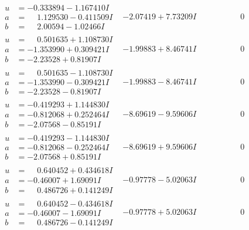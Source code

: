 \documentclass[1p]{elsarticle_modified}
\theoremstyle{definition}
\begin{document}
$$\begin{array}{c|c|c}
\begin{aligned}
u &= -0.333894 - 1.167410 I \\
a &= \phantom{-}1.129530 - 0.411509 I \\
b &= \phantom{-}2.00594 - 1.02466 I\end{aligned}
 & -2.07419 + 7.73209 I & \phantom{-0.000000 } 0 \\ \hline\begin{aligned}
u &= \phantom{-}0.501635 + 1.108730 I \\
a &= -1.353990 + 0.309421 I \\
b &= -2.23528 + 0.81907 I\end{aligned}
 & -1.99883 + 8.46741 I & \phantom{-0.000000 } 0 \\ \hline\begin{aligned}
u &= \phantom{-}0.501635 - 1.108730 I \\
a &= -1.353990 - 0.309421 I \\
b &= -2.23528 - 0.81907 I\end{aligned}
 & -1.99883 - 8.46741 I & \phantom{-0.000000 } 0 \\ \hline\begin{aligned}
u &= -0.419293 + 1.144830 I \\
a &= -0.812068 + 0.252464 I \\
b &= -2.07568 - 0.85191 I\end{aligned}
 & -8.69619 - 9.59606 I & \phantom{-0.000000 } 0 \\ \hline\begin{aligned}
u &= -0.419293 - 1.144830 I \\
a &= -0.812068 - 0.252464 I \\
b &= -2.07568 + 0.85191 I\end{aligned}
 & -8.69619 + 9.59606 I & \phantom{-0.000000 } 0 \\ \hline\begin{aligned}
u &= \phantom{-}0.640452 + 0.434618 I \\
a &= -0.46007 + 1.69091 I \\
b &= \phantom{-}0.486726 + 0.141249 I\end{aligned}
 & -0.97778 - 5.02063 I & \phantom{-0.000000 } 0 \\ \hline\begin{aligned}
u &= \phantom{-}0.640452 - 0.434618 I \\
a &= -0.46007 - 1.69091 I \\
b &= \phantom{-}0.486726 - 0.141249 I\end{aligned}
 & -0.97778 + 5.02063 I & \phantom{-0.000000 } 0\\

\end{array}$$
\end{document}

